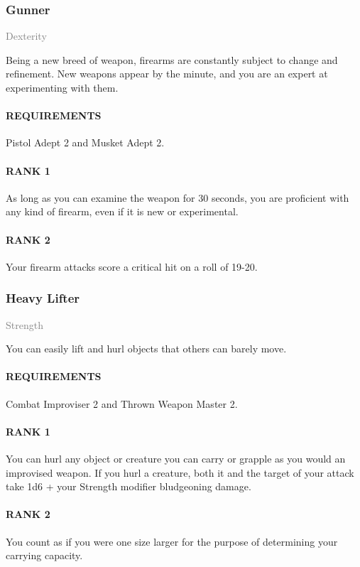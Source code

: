 \subsubsection{Gunner} \label{feat::gunner}
\small{\textcolor{gray}{Dexterity}}

\normalsize
Being a new breed of weapon, firearms are constantly subject to change and refinement.
New weapons appear by the minute, and you are an expert at experimenting with them.
\paragraph{REQUIREMENTS} Pistol Adept 2 and Musket Adept 2.
\paragraph{RANK 1} As long as you can examine the weapon for 30 seconds, you are proficient with any kind of firearm, even if it is new or experimental.
\paragraph{RANK 2} Your firearm attacks score a critical hit on a roll of 19-20.

\subsubsection{Heavy Lifter} \label{feat::heavylifter}
\small{\textcolor{gray}{Strength}}

\normalsize
You can easily lift and hurl objects that others can barely move.
\paragraph{REQUIREMENTS} Combat Improviser 2 and Thrown Weapon Master 2.
\paragraph{RANK 1} You can hurl any object or creature you can carry or grapple as you would an improvised weapon.
If you hurl a creature, both it and the target of your attack take 1d6 + your Strength modifier bludgeoning damage.
\paragraph{RANK 2} You count as if you were one size larger for the purpose of determining your carrying capacity.
